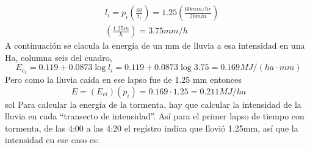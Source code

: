     \begin{problem}
    
    \end{problem}
    \begin{align*}
        &l_i =p_i\left(\frac{60}{t_i}\right) = 1.25\left(\frac{60min/hr}{20min }\right)\\
        &\left(\frac{1.25m}{h}\right)=3.75mm/h
    \end{align*}
    A continuación se clacula la energía de un mm de lluvia a esa intensidad en una Ha, columna seis del cuadro,
    \begin{equation*}
        E_{c_1}=0.119+ 0.0873 \log{l_i}= 0.119 + 0.0873 \log{3.75} = 0.169 MJ / (ha\cdot mm) 
    \end{equation*}
    Pero como la lluvia caída en ese lapso fue de 1.25 mm entonces
    \begin{equation*}
        E = \left(E_{ci}\right)\left(p_i\right) = 0.169 \cdot 1.25= 0.211 MJ / ha
    \end{equation*}
    sol
    Para calcular la energía de la tormenta, hay que calcular la intensidad de la lluvia en cada ``transecto de intensidad''. Así para el primer lapso de tiempo con tormenta, de las 4:00 a las 4:20 el regístro indica que llovió 1.25mm, así que la intensidad en ese caso es:
